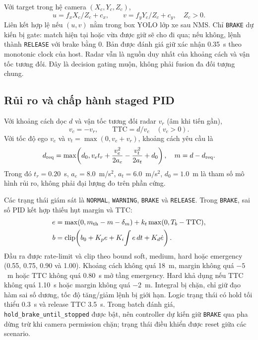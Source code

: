 \documentclass[conference]{IEEEtran}
\begin{document}
Với target trong hệ camera $(X_c,Y_c,Z_c)$,
\begin{equation}
 u=f_xX_c/Z_c+c_x,\qquad v=f_yY_c/Z_c+c_y,\quad Z_c>0.
 \label{eq:projection}
\end{equation}
Liên kết hợp lệ nếu $(u,v)$ nằm trong box YOLO lớp xe sau NMS. Chỉ
\texttt{BRAKE} dự kiến bị gate: match hiện tại hoặc vừa được giữ sẽ cho đi qua;
nếu không, lệnh thành \texttt{RELEASE} với brake bằng 0. Bản được đánh giá giữ
xác nhận 0.35~s theo monotonic clock của host. Radar vẫn là nguồn duy nhất của
khoảng cách và vận tốc tương đối. Đây là decision gating muộn, không phải fusion
đa đối tượng chung.

\subsection{Rủi ro và chấp hành staged PID}
Với khoảng cách dọc $d$ và vận tốc tương đối radar $v_r$ (âm khi tiến gần),
\begin{equation}
 v_c=-v_r,\qquad \mathrm{TTC}=d/v_c\quad(v_c>0).
 \label{eq:ttc}
\end{equation}
Với tốc độ ego $v_e$ và $v_t=\max(0,v_e+v_r)$, khoảng cách yêu cầu là
\begin{equation}
 d_{\rm req}=\max\!\left(d_0, v_et_r+\frac{v_e^2}{2a_e}
 -\frac{v_t^2}{2a_t}+d_0\right),\quad m=d-d_{\rm req}.
 \label{eq:stopping}
\end{equation}
Trong đó $t_r=0.20$~s, $a_e=8.0$~m/s$^2$, $a_t=6.0$~m/s$^2$, $d_0=1.0$~m là
tham số mô hình rủi ro, không phải đại lượng đo trên phần cứng.

Các trạng thái giám sát là \texttt{NORMAL}, \texttt{WARNING}, \texttt{BRAKE} và
\texttt{RELEASE}. Trong \texttt{BRAKE}, sai số PID kết hợp thiếu hụt margin và
TTC:
\begin{equation}
\begin{aligned}
 e&=\max(0,m_{\rm th}-m-\delta_m)+k_t\max(0,T_b-\mathrm{TTC}),\\
 b&=\operatorname{clip}\!\left(b_0+K_pe+K_i\!\int e\,dt+K_d\dot e\right).
\end{aligned}
\label{eq:pid}
\end{equation}
Đầu ra được rate-limit và clip theo bound soft, medium, hard hoặc emergency
(0.55, 0.75, 0.90 và 1.00). Khoảng cách không quá 18~m, margin không quá $-5$~m
hoặc TTC không quá 0.80~s mở tầng emergency. Hard khả dụng nếu TTC không quá
1.10~s hoặc margin không quá $-2$~m. Integral bị chặn, chỉ giữ đạo hàm sai số
dương, tốc độ tăng/giảm lệnh bị giới hạn. Logic trạng thái có hold tối thiểu
0.3~s và release TTC 3.5~s. Trong batch đánh giá,
\texttt{hold\_brake\_until\_stopped} được bật, nên controller dự kiến giữ
\texttt{BRAKE} qua pha dừng trừ khi camera permission chặn; trạng thái điều khiển
được reset giữa các scenario.
\end{document}

